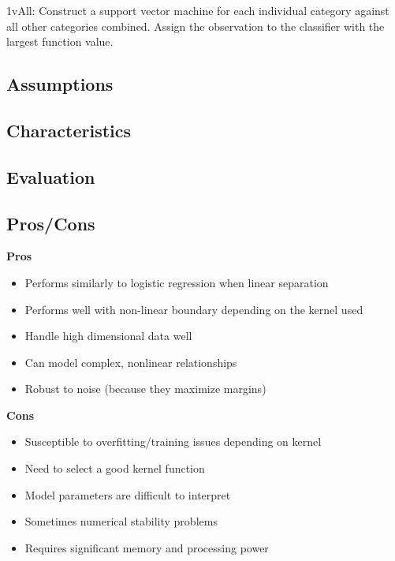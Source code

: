 \documentclass[]{book}
\theoremstyle{definition}
\theoremstyle{definition}
\theoremstyle{definition}
\theoremstyle{remark}
\begin{document}
1vAll: Construct a support vector machine for each individual category
against all other categories combined. Assign the observation to the
classifier with the largest function value.

\subsection{Assumptions}\label{assumptions-12}

\subsection{Characteristics}\label{characteristics-7}

\subsection{Evaluation}\label{evaluation-12}

\subsection{Pros/Cons}\label{proscons-12}

\textbf{Pros}

\begin{itemize}
\item
  Performs similarly to logistic regression when linear separation
\item
  Performs well with non-linear boundary depending on the kernel used
\item
  Handle high dimensional data well
\item
  Can model complex, nonlinear relationships
\item
  Robust to noise (because they maximize margins)
\end{itemize}

\textbf{Cons}

\begin{itemize}
\item
  Susceptible to overfitting/training issues depending on kernel
\item
  Need to select a good kernel function
\item
  Model parameters are difficult to interpret
\item
  Sometimes numerical stability problems
\item
  Requires significant memory and processing power
\end{itemize}
\end{document}
